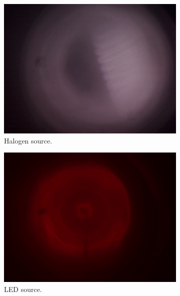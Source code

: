 \documentclass[a4paper, 12pt]{paper}
\begin{document}
\begin{figure}[h]
    \centering
    \begin{subfigure}[p]{0.30\textwidth}
        \includegraphics[width=\textwidth]{img/halogen_filament}
        \caption{Halogen source.}
    \end{subfigure}
    \begin{subfigure}[p]{0.30\textwidth}
        \includegraphics[width=\textwidth]{img/led_chip}
        \caption{LED source.}
    \end{subfigure}
    \begin{subfigure}[p]{0.30\textwidth}

\end{subfigure}
\end{figure}
\end{document}
